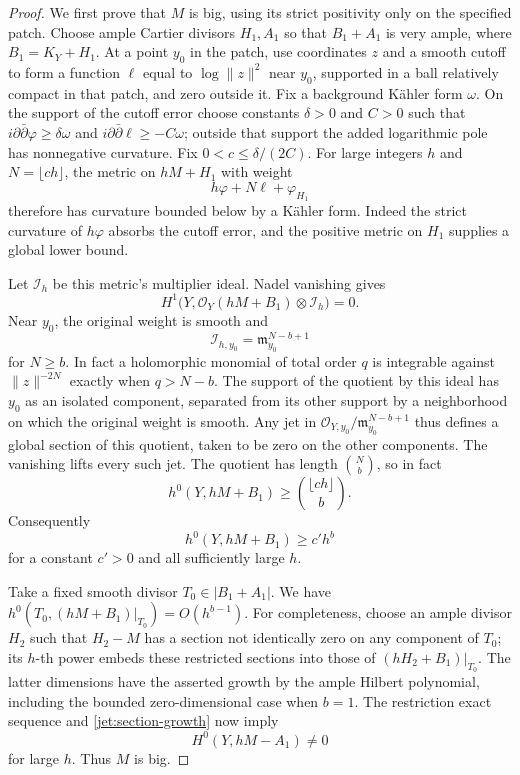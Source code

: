 \begin{proof}
We first prove that $M$ is big, using its strict positivity only on the
specified patch.  Choose ample Cartier divisors $H_1,A_1$ so that
$B_1+A_1$ is very ample, where $B_1=K_Y+H_1$.
At a point $y_0$ in the patch, use coordinates $z$ and a smooth cutoff
to form a function $\ell$ equal to $\log\|z\|^2$ near $y_0$, supported
in a ball relatively compact in that patch, and zero outside it.
Fix a background K\"ahler form $\omega$.  On the support of the
cutoff error choose constants $\delta>0$ and $C>0$ such that
$i\partial\bar\partial\varphi\geq\delta\omega$ and
$i\partial\bar\partial\ell\geq-C\omega$; outside that support the
added logarithmic pole has nonnegative curvature.  Fix
$0<c\leq\delta/(2C)$.  For large integers $h$ and
$N=\lfloor ch\rfloor$, the metric
on $hM+H_1$ with weight
\[
 h\varphi+N\ell+\varphi_{H_1}
\]
therefore has curvature bounded below by a K\"ahler form.
Indeed the strict curvature of $h\varphi$ absorbs the cutoff error,
and the positive metric on $H_1$ supplies a global lower bound.

Let $\mathcal I_h$ be this metric's multiplier ideal.  Nadel vanishing
\cite{Nadel1990} gives
\[
 H^1\bigl(Y,\mathcal O_Y(hM+B_1)\otimes\mathcal I_h\bigr)=0.
\]
Near $y_0$, the original weight is smooth and
\[
 \mathcal I_{h,y_0}=\mathfrak m_{y_0}^{N-b+1}
\]
for $N\geq b$.  In fact a holomorphic monomial of total order $q$
is integrable against $\|z\|^{-2N}$ exactly when $q>N-b$.
The support of the quotient by this ideal has $y_0$ as an isolated
component, separated from its other support by a neighborhood on which
the original weight is smooth.  Any jet in
$\mathcal O_{Y,y_0}/\mathfrak m_{y_0}^{N-b+1}$ thus defines a global
section of this quotient, taken to be zero on the other components.
The vanishing lifts every such jet.  The quotient has length
$\binom{N}{b}$, so in fact
\[
 h^0(Y,hM+B_1)\geq\binom{\lfloor ch\rfloor}{b}.
\]
Consequently
\begin{equation}\label{jet:section-growth}
 h^0(Y,hM+B_1)\geq c' h^b
\end{equation}
for a constant $c'>0$ and all sufficiently large $h$.

Take a fixed smooth divisor $T_0\in|B_1+A_1|$.  We have
$h^0(T_0,(hM+B_1)|_{T_0})=O(h^{b-1})$.
For completeness, choose an ample divisor $H_2$ such that
$H_2-M$ has a section not identically zero on any component of $T_0$;
its $h$-th power embeds these restricted sections into those of
$(hH_2+B_1)|_{T_0}$.  The latter dimensions have the asserted growth by
the ample Hilbert polynomial, including the bounded zero-dimensional
case when $b=1$.  The restriction exact sequence and
\eqref{jet:section-growth} now imply
\[
 H^0(Y,hM-A_1)\ne0
\]
for large $h$.  Thus $M$ is big.


\end{proof}
